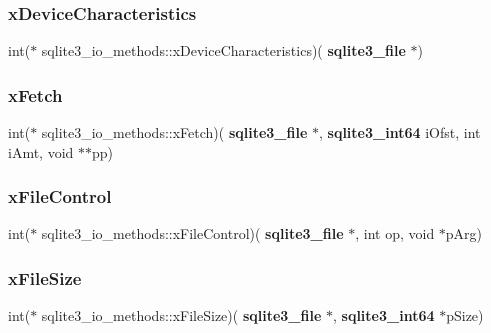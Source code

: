 \mbox{\label{structsqlite3__io__methods_ace5e9e9f267c6c57023109c0658f2683}} 
\subsubsection{xDeviceCharacteristics}
{\footnotesize\ttfamily int($\ast$ sqlite3\+\_\+io\+\_\+methods\+::x\+Device\+Characteristics)(\textbf{ sqlite3\+\_\+file} $\ast$)}

\mbox{\label{structsqlite3__io__methods_ad817335f15cad777b60d973f73cb542c}} 
\subsubsection{xFetch}
{\footnotesize\ttfamily int($\ast$ sqlite3\+\_\+io\+\_\+methods\+::x\+Fetch)(\textbf{ sqlite3\+\_\+file} $\ast$, \textbf{ sqlite3\+\_\+int64} i\+Ofst, int i\+Amt, void $\ast$$\ast$pp)}

\mbox{\label{structsqlite3__io__methods_a5d2a5ba7937b4a6c6c5ba62c4e2b9166}} 
\subsubsection{xFileControl}
{\footnotesize\ttfamily int($\ast$ sqlite3\+\_\+io\+\_\+methods\+::x\+File\+Control)(\textbf{ sqlite3\+\_\+file} $\ast$, int op, void $\ast$p\+Arg)}

\mbox{\label{structsqlite3__io__methods_ad269e3cbda39d0a2383aef13b60b02f8}} 
\subsubsection{xFileSize}
{\footnotesize\ttfamily int($\ast$ sqlite3\+\_\+io\+\_\+methods\+::x\+File\+Size)(\textbf{ sqlite3\+\_\+file} $\ast$, \textbf{ sqlite3\+\_\+int64} $\ast$p\+Size)}

\mbox{\label{structsqlite3__io__methods_a3e4749687788b89ed0f672db7a4f6ac8}} 
